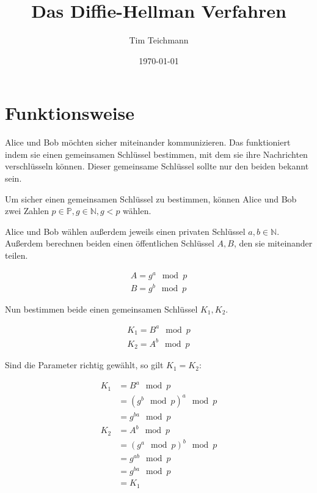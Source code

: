 \documentclass[12pt,twocolumn]{report}
\title{Das Diffie-Hellman Verfahren}
\author{Tim Teichmann}
\date{\today}
\begin{document}
\maketitle

\section*{Funktionsweise}
\begin{flushleft}
Alice und Bob möchten sicher miteinander kommunizieren.
Das funktioniert indem sie einen gemeinsamen Schlüssel bestimmen,
mit dem sie ihre Nachrichten verschlüsseln können. Dieser gemeinsame
Schlüssel sollte nur den beiden bekannt sein.

Um sicher einen gemeinsamen Schlüssel zu bestimmen, können Alice und Bob
zwei Zahlen $p\in\mathbb{P},g\in\mathbb{N},g<p$ wählen.

Alice und Bob wählen außerdem jeweils einen privaten Schlüssel $a,b\in\mathbb{N}$.
Außerdem berechnen beiden einen öffentlichen Schlüssel $A,B$, den sie miteinander teilen.
\end{flushleft}

\begin{align}
    A=g^a \mod p \\
    B=g^b \mod p
\end{align}

\begin{flushleft}
Nun bestimmen beide einen gemeinsamen Schlüssel $K_1,K_2$.
\end{flushleft}

\begin{align}
    K_1=B^a \mod p \\
    K_2=A^b \mod p
\end{align}

\begin{flushleft}
Sind die Parameter richtig gewählt, so gilt $K_1=K_2$:
\end{flushleft}

\begin{align}
    K_1&=B^a \mod p \\
    &=\left(g^b \mod p\right)^a \mod p \\
    &=g^{ba} \mod p \\
    K_2&=A^b \mod p \\
    &=\left(g^a \mod p\right)^b \mod p \\
    &=g^{ab} \mod p \\
    &=g^{ba} \mod p \\
    &=K_1
\end{align}
\end{document}
